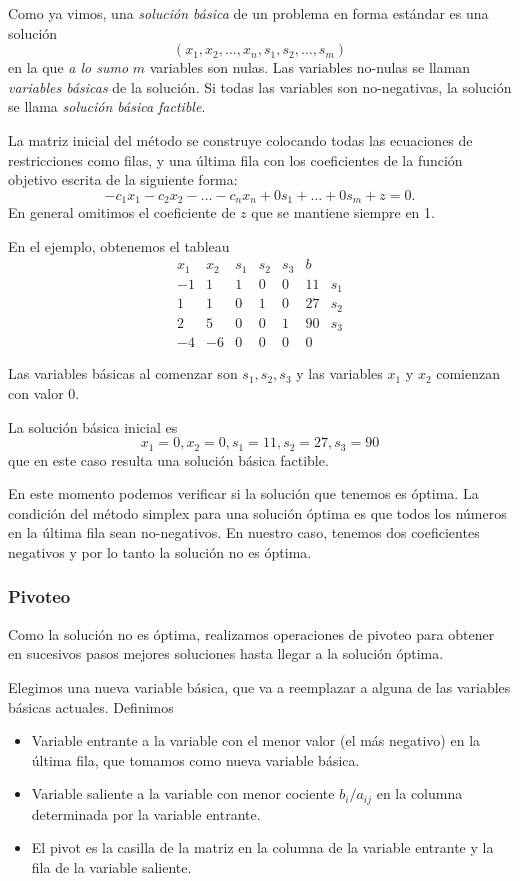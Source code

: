 Como ya vimos, una \emph{solución básica} de un problema en forma estándar es una solución
$$(x_1, x_2, \dots, x_n, s_1, s_2, \dots, s_m)$$
 en la que \emph{a lo sumo} $m$ variables son nulas. Las variables no-nulas se llaman \emph{variables b\'asicas} de la solución. Si todas las variables son no-negativas, la solución se llama \emph{solución básica factible}.

La matriz inicial del método se construye colocando todas las ecuaciones de restricciones como filas, y una última fila con los coeficientes de la función objetivo escrita de la siguiente forma:
$$
-c_1 x_1 - c_2 x_2 - \dots - c_n x_n + 0 s_1 + \dots + 0 s_m + z = 0.
$$
En general omitimos el coeficiente de $z$ que se mantiene siempre en 1.

En el ejemplo, obtenemos el tableau
$$
\begin{array}{ccccccc}
x_1 & x_2 & s_1 & s_2 & s_3 & b & \\ \hline
-1 & 1 & 1 & 0 & 0 & 11 & s_1 \\
1 & 1 & 0 & 1 & 0 & 27 & s_2 \\
2 & 5 & 0 & 0 & 1 & 90 & s_3 \\ \hline
-4 & -6 & 0 & 0 & 0 & 0 &
\end{array}
$$

Las variables básicas al comenzar son $s_1, s_2, s_3$ y las variables $x_1$ y $x_2$ comienzan con valor $0$.

La solución básica inicial es
$$
x_1 = 0, x_2 = 0, s_1 = 11, s_2 = 27, s_3 = 90
$$
que en este caso resulta una solución básica factible.

En este momento podemos verificar si la solución que tenemos es óptima. La condición del método simplex para una solución óptima es que todos los números en la última fila sean no-negativos. En nuestro caso, tenemos dos coeficientes negativos y por lo tanto la solución no es óptima.

\subsubsection{Pivoteo}
Como la solución no es óptima, realizamos operaciones de pivoteo para obtener en sucesivos pasos mejores soluciones hasta llegar a la solución óptima.

Elegimos una nueva variable básica, que va a reemplazar a alguna de las variables básicas actuales.
Definimos
\begin{itemize}
\item Variable entrante a la variable con el menor valor (el más negativo) en la última fila, que tomamos como nueva variable básica.
\item Variable saliente a la variable con menor cociente $b_i / a_{ij}$ en la columna determinada por la variable entrante.
\item El pivot es la casilla de la matriz en la columna de la variable entrante y la fila de la variable saliente.
\end{itemize}

